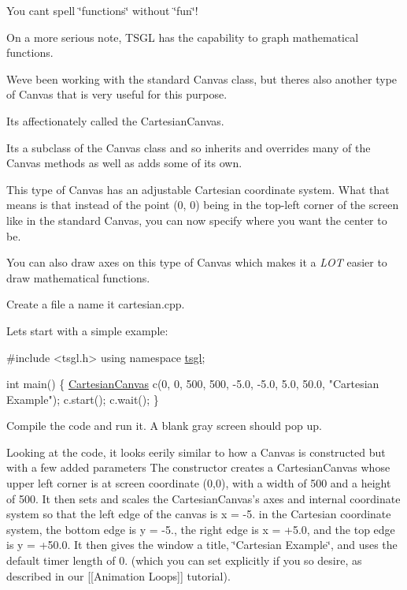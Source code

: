 You can\textquotesingle{}t spell \char`\"{}functions\char`\"{} without \char`\"{}fun\char`\"{}!

On a more serious note, T\+S\+G\+L has the capability to graph mathematical functions.

We\textquotesingle{}ve been working with the standard Canvas class, but there\textquotesingle{}s also another type of Canvas that is very useful for this purpose.

It\textquotesingle{}s affectionately called the Cartesian\+Canvas.

Its a subclass of the Canvas class and so inherits and overrides many of the Canvas methods as well as adds some of its own.

This type of Canvas has an adjustable Cartesian coordinate system. What that means is that instead of the point (0, 0) being in the top-\/left corner of the screen like in the standard Canvas, you can now specify where you want the center to be.

You can also draw axes on this type of Canvas which makes it a {\itshape L\+O\+T} easier to draw mathematical functions.

Create a file a name it cartesian.\+cpp.

Let\textquotesingle{}s start with a simple example\+:


\begin{DoxyCode}
\textcolor{preprocessor}{#include <tsgl.h>}
\textcolor{keyword}{using namespace }\hyperlink{namespacetsgl}{tsgl};

\textcolor{keywordtype}{int} main() \{
  \hyperlink{classtsgl_1_1_cartesian_canvas}{CartesianCanvas} c(0, 0, 500, 500, -5.0, -5.0, 5.0, 50.0, \textcolor{stringliteral}{"Cartesian Example"});
  c.start();
  c.wait();
\}
\end{DoxyCode}


Compile the code and run it. A blank gray screen should pop up.

Looking at the code, it looks eerily similar to how a Canvas is constructed but with a few added parameters The constructor creates a Cartesian\+Canvas whose upper left corner is at screen coordinate (0,0), with a width of 500 and a height of 500. It then sets and scales the Cartesian\+Canvas’s axes and internal coordinate system so that the left edge of the canvas is x = -\/5. in the Cartesian coordinate system, the bottom edge is y = -\/5., the right edge is x = +5.0, and the top edge is y = +50.0. It then gives the window a title, \char`\"{}\+Cartesian Example\char`\"{}, and uses the default timer length of 0. (which you can set explicitly if you so desire, as described in our \mbox{[}\mbox{[}Animation Loops\mbox{]}\mbox{]} tutorial).

